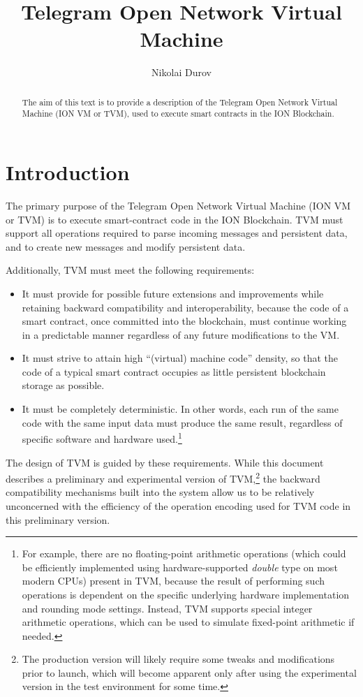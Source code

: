 \documentclass[12pt,oneside]{article}
\title{Telegram Open Network Virtual Machine}
\author{Nikolai Durov}
\def\markbothsame#1{\fancyhead[C]{#1}}
\begin{document}
\maketitle

\begin{abstract}
  The aim of this text is to provide a description of the Telegram
  Open Network Virtual Machine (ION VM or TVM), used to execute smart
  contracts in the ION Blockchain.
\end{abstract}

\section*{Introduction}
\markbothsame{Introduction}

The primary purpose of the Telegram Open Network Virtual Machine (ION VM or TVM) is to execute smart-contract code in the ION Blockchain. TVM must support all operations required to parse incoming messages and persistent data, and to create new messages and modify persistent data.

Additionally, TVM must meet the following requirements:
\begin{itemize}
\item It must provide for possible future extensions and improvements while retaining backward compatibility and interoperability, because the code of a smart contract, once committed into the blockchain, must continue working in a predictable manner regardless of any future modifications to the VM.
\item It must strive to attain high ``(virtual) machine code'' density, so that the code of a typical smart contract occupies as little persistent block\-chain storage as possible.
\item It must be completely deterministic. In other words, each run of the same code with the same input data must produce the same result, regardless of specific software and hardware used.\footnote{For example, there are no floating-point arithmetic operations (which could be efficiently implemented using hardware-supported {\em double\/} type on most modern CPUs) present in TVM, because the result of performing such operations is dependent on the specific underlying hardware implementation and rounding mode settings. Instead, TVM supports special integer arithmetic operations, which can be used to simulate fixed-point arithmetic if needed.}
\end{itemize}
The design of TVM is guided by these requirements. While this document describes a preliminary and experimental version of TVM,\footnote{The production version will likely require some tweaks and modifications prior to launch, which will become apparent only after using the experimental version in the test environment for some time.} the backward compatibility mechanisms built into the system allow us to be relatively unconcerned with the efficiency of the operation encoding used for TVM code in this preliminary version.
\end{document}
